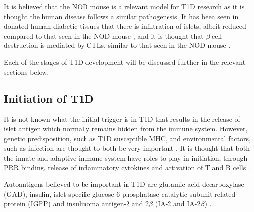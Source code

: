 It is believed that the NOD mouse is a relevant model for T1D research as it is thought the human disease follows a similar pathogenesis.
It has been seen in donated human diabetic tissues that there is infiltration of islets, albeit reduced compared to that seen in the NOD mouse \citep{Veld2014}, and it is thought that $\beta$ cell destruction is mediated by CTLs, similar to that seen in the NOD mouse \citep{Hanafusa2008}. 


Each of the stages of T1D development will be discussed further in the relevant sections below.


\subsection{Initiation of T1D}



It is not known what the initial trigger is in T1D that results in the release of islet antigen which normally remains hidden from the immune system.
However, genetic predisposition, such as T1D susceptible MHC, and environmental factors, such as infection \citep{Filippi2008} are thought to both be very important \citep{Knip2005}.
It is thought that both the innate and adaptive immune system have roles to play in initiation, through PRR binding, release of inflammatory cytokines and activation of T and B cells \citep{Diana2011}.

Autoantigens believed to be important in T1D are glutamic acid decarboxylase (GAD), insulin, islet-specific glucose-6-phosphatase catalytic subunit-related protein (IGRP) and insulinoma antigen-2 and 2$\beta$ (IA-2 and IA-2$\beta$) \citep{Green1999, Roep2012}.




